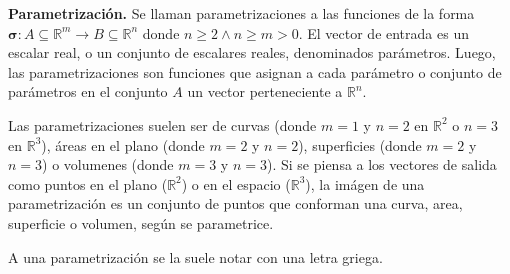 \begin{definition}\textbf{Parametrización.}
    Se llaman parametrizaciones a las funciones de la forma $\boldsymbol{\sigma}:A\subseteq\mathbb{R}^m\rightarrow B\subseteq\mathbb{R}^n$
    donde $n\geq2 \land n\geq m>0$. El vector de entrada es un escalar real, o un conjunto de escalares reales, denominados parámetros.
    Luego, las parametrizaciones son funciones que asignan a cada parámetro o conjunto de parámetros en el conjunto $A$
    un vector perteneciente a $\mathbb{R}^n$. 
    
    Las parametrizaciones suelen ser de curvas (donde $m=1$ y $n=2$ en $\mathbb{R}^2$ o $n=3$ en $\mathbb{R}^3$),
    áreas en el plano (donde $m=2$ y $n=2$), superficies (donde $m=2$ y $n=3$) o volumenes (donde $m=3$ y $n=3$).
    Si se piensa a los vectores de salida como puntos en el plano ($\mathbb{R}^2$) o en el espacio ($\mathbb{R}^3$),
    la imágen de una parametrización es un conjunto de puntos que conforman una curva, area, superficie o volumen, según se parametrice.

    A una parametrización se la suele notar con una letra griega.


\end{definition}
